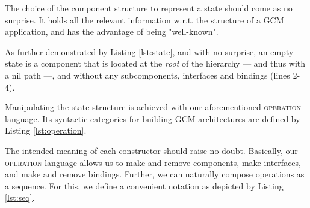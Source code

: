 			


	\noindent The choice of the \textsf{component} structure to represent a \textsf{state} should come as no surprise.
	It holds all the relevant information w.r.t. the structure of a \ac{GCM} application, and has the advantage of
	being "well-known".
	
	 As further demonstrated by Listing \ref{lst:state}, and with no surprise, 
	 an empty \textsf{state} is a \textsf{component} that is located at 
	the \textit{root} of the hierarchy --- and thus with a \textsf{nil path} ---, and without any 
	 sub\textsf{component}s, \textsf{interface}s and \textsf{binding}s (lines 2-4). 
	
	Manipulating  the \textsf{state} structure is achieved with our aforementioned 
	\textsc{operation} language. Its syntactic categories for building 
	\ac{GCM} architectures are defined by Listing \ref{lst:operation}.
	
	
		

	
	\noindent The intended meaning of each constructor should raise no doubt. Basically, 
	our \textsc{operation} language allows us to make and remove components, make interfaces, and make and remove 
	bindings. Further, we can naturally compose \textsf{operation}s as a sequence. For this, we define a convenient
	notation as depicted by Listing \ref{lst:seq}.
	
